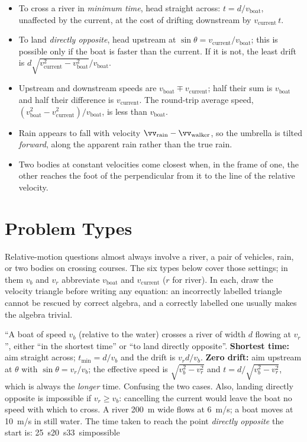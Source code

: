 \begin{itemize}
\item To cross a river in \emph{minimum time}, head straight across: $t=d/v_{\text{boat}}$, unaffected by
      the current, at the cost of drifting downstream by $v_{\text{current}}\,t$.
\item To land \emph{directly opposite}, head upstream at $\sin\theta=v_{\text{current}}/v_{\text{boat}}$;
      this is possible only if the boat is faster than the current. If it is not, the least drift is
      $d\sqrt{v_{\text{current}}^2-v_{\text{boat}}^2}/v_{\text{boat}}$.
\item Upstream and downstream speeds are $v_{\text{boat}}\mp v_{\text{current}}$; half their sum is
      $v_{\text{boat}}$ and half their difference is $v_{\text{current}}$. The round-trip average speed,
      $(v_{\text{boat}}^2-v_{\text{current}}^2)/v_{\text{boat}}$, is less than $v_{\text{boat}}$.
\item Rain appears to fall with velocity $\vv_{\text{rain}}-\vv_{\text{walker}}$, so the umbrella is
      tilted \emph{forward}, along the apparent rain rather than the true rain.
\item Two bodies at constant velocities come closest when, in the frame of one, the other reaches the
      foot of the perpendicular from it to the line of the relative velocity.
\end{itemize}

\section{Problem Types}\label{sec:types5}
Relative-motion questions almost always involve a river, a pair of vehicles, rain, or two bodies on
crossing courses. The six types below cover those settings; in them $v_b$ and $v_r$ abbreviate
$v_{\text{boat}}$ and $v_{\text{current}}$ ($r$ for river). In each, draw the velocity triangle before writing any equation: an
incorrectly labelled triangle cannot be rescued by correct algebra, and a correctly labelled one usually
makes the algebra trivial.

{``A boat of speed $v_b$ (relative to the water) crosses a river of width $d$ flowing at $v_r$'', either
``in the shortest time'' or ``to land directly opposite''.}
{\textbf{Shortest time:} aim straight across; $t_{\min}=d/v_b$ and the drift is $v_rd/v_b$.
\textbf{Zero drift:} aim upstream at $\theta$ with $\sin\theta=v_r/v_b$; the effective speed is
$\sqrt{v_b^2-v_r^2}$ and $t=d/\sqrt{v_b^2-v_r^2}$, which is always the \emph{longer} time.}
{Confusing the two cases. Also, landing directly opposite is impossible if $v_r\ge v_b$: cancelling the
current would leave the boat no speed with which to cross.}
{A river \SI{200}{m} wide flows at \SI{6}{m/s}; a boat moves at \SI{10}{m/s} in still water. The time
taken to reach the point \emph{directly opposite} the start is:}
{\SI{25}{s}}{\SI{20}{s}}{\SI{33}{s}}{impossible}

